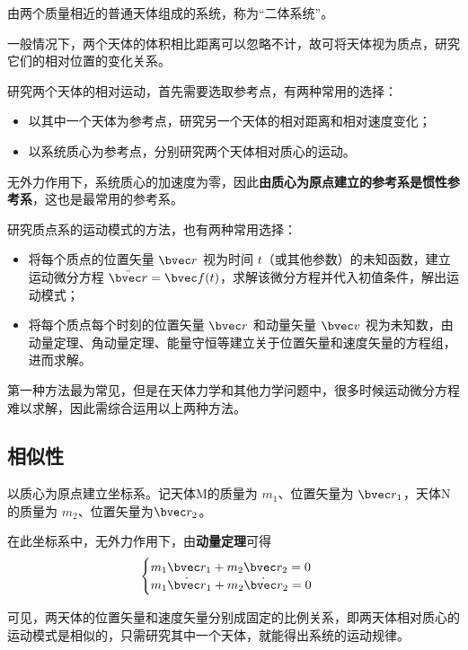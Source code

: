 

由两个质量相近的普通天体组成的系统，称为“二体系统”。

一般情况下，两个天体的体积相比距离可以忽略不计，故可将天体视为质点，研究它们的相对位置的变化关系。

研究两个天体的相对运动，首先需要选取参考点，有两种常用的选择：
\begin{itemize}
\item 以其中一个天体为参考点，研究另一个天体的相对距离和相对速度变化；
\item 以系统质心为参考点，分别研究两个天体相对质心的运动。
\end{itemize}

无外力作用下，系统质心的加速度为零，因此\textbf{由质心为原点建立的参考系是惯性参考系}，这也是最常用的参考系。

研究质点系的运动模式的方法，也有两种常用选择：
\begin{itemize}
\item 将每个质点的位置矢量 $\bvec r$ 视为时间 $t$（或其他参数）的未知函数，建立运动微分方程 $\ddot{\bvec r}= \bvec f (t)$，求解该微分方程并代入初值条件，解出运动模式；
\item 将每个质点每个时刻的位置矢量 $\bvec r$ 和动量矢量 $\bvec v$ 视为未知数，由动量定理、角动量定理、能量守恒等建立关于位置矢量和速度矢量的方程组，进而求解。
\end{itemize}
第一种方法最为常见，但是在天体力学和其他力学问题中，很多时候运动微分方程难以求解，因此需综合运用以上两种方法。

\subsection{相似性}
以质心为原点建立坐标系。记天体M的质量为 $m_1$、位置矢量为 $\bvec r_1$，天体N的质量为 $m_2$、位置矢量为$\bvec r_2$。

在此坐标系中，无外力作用下，由\textbf{动量定理}可得
\begin{equation}
\begin{cases}
m_1 \bvec r_1 + m_2 \bvec r_2 = 0\\
m_1 \dot{\bvec r}_1 + m_2 \dot{\bvec r}_2=0
\end{cases}
\end{equation}

可见，两天体的位置矢量和速度矢量分别成固定的比例关系，即两天体相对质心的运动模式是相似的，只需研究其中一个天体，就能得出系统的运动规律。

